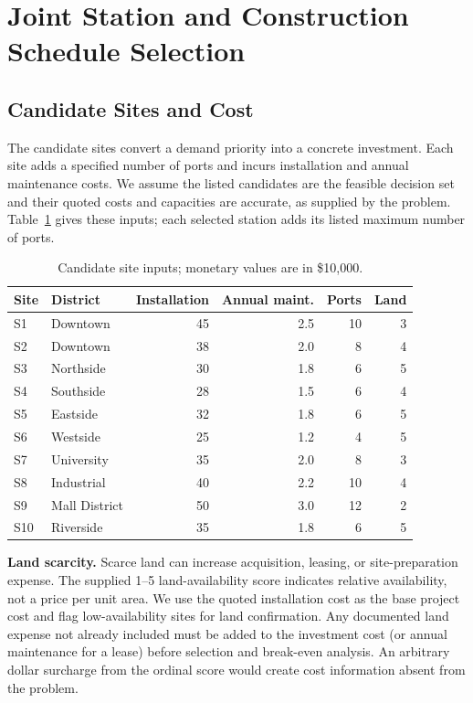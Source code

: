\documentclass[12pt]{article}
\begin{document}
\section{Joint Station and Construction Schedule Selection}
\label{sec:selection}
\subsection{Candidate Sites and Cost}
\label{subsec:site-attributes}
The candidate sites convert a demand priority into a concrete investment. Each site
adds a specified number of ports and incurs installation and annual maintenance costs.
We assume the listed candidates are the feasible decision set and their quoted costs
and capacities are accurate, as supplied by the problem. Table~\ref{tab:sites} gives
these inputs; each selected station adds its listed maximum number of ports.
\begin{table}[htbp]\centering\small
\caption{Candidate site inputs; monetary values are in \$10,000.}\label{tab:sites}
\begin{tabular}{@{}llrrrr@{}}\toprule
Site&District&Installation&Annual maint.&Ports&Land\\\midrule
S1&Downtown&45&2.5&10&3\\
S2&Downtown&38&2.0&8&4\\
S3&Northside&30&1.8&6&5\\
S4&Southside&28&1.5&6&4\\
S5&Eastside&32&1.8&6&5\\
S6&Westside&25&1.2&4&5\\
S7&University&35&2.0&8&3\\
S8&Industrial&40&2.2&10&4\\
S9&Mall District&50&3.0&12&2\\
S10&Riverside&35&1.8&6&5\\\bottomrule
\end{tabular}\end{table}

\textbf{Land scarcity.} Scarce land can increase acquisition, leasing, or site-preparation
expense. The supplied 1--5 land-availability score indicates relative availability,
not a price per unit area. We use the quoted installation cost as the base project
cost and flag low-availability sites for land confirmation. Any documented land expense
not already included must be added to the investment cost (or annual maintenance for
a lease) before selection and break-even analysis. An arbitrary dollar surcharge from
the ordinal score would create cost information absent from the problem.
\end{document}
